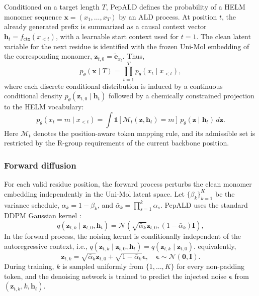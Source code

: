 \begin{methods}
Conditioned on a target length $T$, PepALD defines the probability of a HELM monomer sequence $\mathbf{x}=(x_1,\ldots,x_T)$ by an ALD process. At position $t$, the already generated prefix is summarized as a causal context vector $\mathbf{h}_t=f_{\mathrm{ctx}}(x_{<t})$, with a learnable start context used for $t=1$. The clean latent variable for the next residue is identified with the frozen Uni-Mol embedding of the corresponding monomer, $\mathbf{z}_{t,0}=\tilde{\mathbf{e}}_{x_t}$. Thus,
\begin{equation}
p_\theta(\mathbf{x}\mid T)=\prod_{t=1}^{T}p_\theta(x_t\mid x_{<t}),
\label{eq:ald_ar_factorization}
\end{equation}
where each discrete conditional distribution is induced by a continuous conditional density $p_\theta(\mathbf{z}_{t,0}\mid \mathbf{h}_t)$ followed by a chemically constrained projection to the HELM vocabulary:
\begin{equation}
p_\theta(x_t=m\mid x_{<t})=
\int \mathds{1}\!\left[\mathcal{M}_t(\mathbf{z},\mathbf{h}_t)=m\right]\,
p_\theta(\mathbf{z}\mid \mathbf{h}_t)\,d\mathbf{z}.
\label{eq:ald_induced_token_distribution}
\end{equation}
Here $\mathcal{M}_t$ denotes the position-aware token mapping rule, and its admissible set is restricted by the R-group requirements of the current backbone position.

\subsubsection{Forward diffusion}

For each valid residue position, the forward process perturbs the clean monomer embedding independently in the Uni-Mol latent space. Let $\{\beta_k\}_{k=1}^{K}$ be the variance schedule, $\alpha_k=1-\beta_k$, and $\bar{\alpha}_k=\prod_{s=1}^{k}\alpha_s$. PepALD uses the standard DDPM Gaussian kernel \citep{ref_ddpm}:
\begin{equation}
q(\mathbf{z}_{t,k}\mid \mathbf{z}_{t,0},\mathbf{h}_t)
=\mathcal{N}\!\left(\sqrt{\bar{\alpha}_k}\mathbf{z}_{t,0},
(1-\bar{\alpha}_k)\mathbf{I}\right),
\label{eq:ald_forward_kernel}
\end{equation}
In the forward process, the noising kernel is conditionally independent of the autoregressive context, i.e., $q(\mathbf{z}_{t,k}\mid \mathbf{z}_{t,0},\mathbf{h}_t)=q(\mathbf{z}_{t,k}\mid \mathbf{z}_{t,0})$.
equivalently,
\begin{equation}
\mathbf{z}_{t,k}=\sqrt{\bar{\alpha}_k}\mathbf{z}_{t,0}
+\sqrt{1-\bar{\alpha}_k}\boldsymbol{\epsilon},\quad
\boldsymbol{\epsilon}\sim\mathcal{N}(\mathbf{0},\mathbf{I}).
\label{eq:ald_forward_sample}
\end{equation}
During training, $k$ is sampled uniformly from $\{1,\ldots,K\}$ for every non-padding token, and the denoising network is trained to predict the injected noise $\boldsymbol{\epsilon}$ from $(\mathbf{z}_{t,k},k,\mathbf{h}_t)$.


\end{methods}

